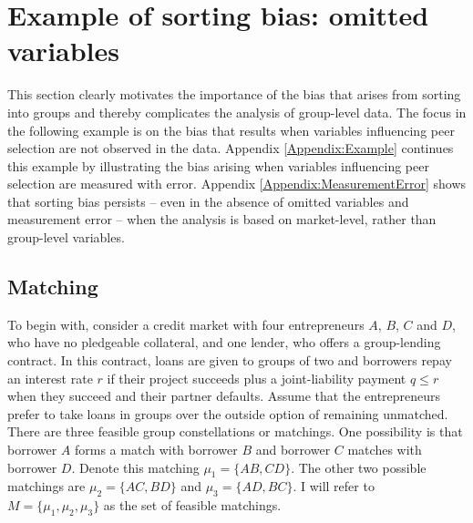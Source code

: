 \section{Example of sorting bias: omitted variables} \label{Section:Example} 

This section clearly motivates the importance of the bias that arises from sorting into groups and thereby complicates the analysis of group-level data. The focus in the following example is on the bias that results when variables influencing peer selection are not observed in the data. Appendix \ref{Appendix:Example} continues this example by illustrating the bias arising when variables influencing peer selection are measured with error. Appendix \ref{Appendix:MeasurementError} shows that sorting bias persists -- even in the absence of omitted variables and measurement error -- when the analysis is based on market-level, rather than group-level variables.



\subsection{Matching}

To begin with, consider a credit market with four entrepreneurs $A$, $B$, $C$ and $D$, who have no pledgeable collateral, and one lender, who offers a group-lending contract. In this contract, loans are given to groups of two and borrowers repay an interest rate $r$ if their project succeeds plus a joint-liability payment $q\leq r$ when they succeed and their partner defaults. Assume that the entrepreneurs prefer to take loans in groups over the outside option of remaining unmatched.
There are three feasible group constellations or matchings. One possibility is that borrower $A$ forms a match with borrower $B$ and borrower $C$ matches with borrower $D$. Denote this matching $\mu_1=\{ AB, CD \}$. The other two possible matchings are $\mu_2=\{ AC, BD \}$ and $\mu_3=\{ AD, BC \}$. I will refer to $M=\{ \mu_1, \mu_2, \mu_3\}$ as the set of feasible matchings. 


